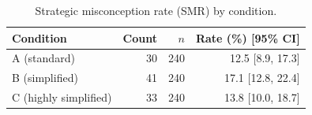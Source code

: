 \begin{table}[H]
\caption{Strategic misconception rate (SMR) by condition.}
\label{tab:sm:cond}
\centering
\begin{tabular}{lrrr}
\toprule
Condition & Count & $n$ & Rate (\%) [95\% CI] \\
\midrule
A (standard) & 30 & 240 & 12.5 [8.9, 17.3] \\
B (simplified) & 41 & 240 & 17.1 [12.8, 22.4] \\
C (highly simplified) & 33 & 240 & 13.8 [10.0, 18.7] \\
\bottomrule
\end{tabular}
\end{table}
